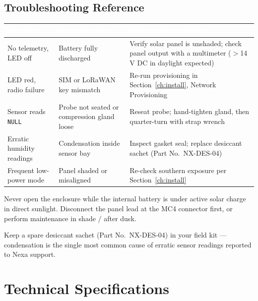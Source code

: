 \documentclass[11pt,a4paper,oneside,headings=big,chapterprefix=true]{scrreprt}
\begin{document}
\section{Troubleshooting Reference}

\begin{center}
\renewcommand{\arraystretch}{1.35}
\begin{tabularx}{\textwidth}{@{}X X X@{}}
\toprule
\rowcolor{steel}
\textcolor{white}{\bfseries Symptom} & \textcolor{white}{\bfseries Probable Cause} & \textcolor{white}{\bfseries Recommended Action} \\
\midrule
No telemetry, LED off & Battery fully discharged & Verify solar panel is unshaded; check panel output with a multimeter ($>$14\,V DC in daylight expected) \\
\rowcolor{fogbg}
LED red, radio failure & SIM or LoRaWAN key mismatch & Re-run provisioning in Section~\ref{ch:install}, Network Provisioning \\
Sensor reads \texttt{NULL} & Probe not seated or compression gland loose & Reseat probe; hand-tighten gland, then quarter-turn with strap wrench \\
\rowcolor{fogbg}
Erratic humidity readings & Condensation inside sensor bay & Inspect gasket seal; replace desiccant sachet (Part No.\ NX-DES-04) \\
Frequent low-power mode & Panel shaded or misaligned & Re-check southern exposure per Section~\ref{ch:install} \\
\bottomrule
\end{tabularx}
\end{center}

\begin{warnbox}
Never open the enclosure while the internal battery is under active solar charge in direct sunlight. Disconnect the panel lead at the MC4 connector first, or perform maintenance in shade / after dusk.
\end{warnbox}

\begin{tipbox}
Keep a spare desiccant sachet (Part No.\ NX-DES-04) in your field kit --- condensation is the single most common cause of erratic sensor readings reported to Nexa support.
\end{tipbox}

\appendix
\chapter{Technical Specifications}
\label{app:specs}
\end{document}
